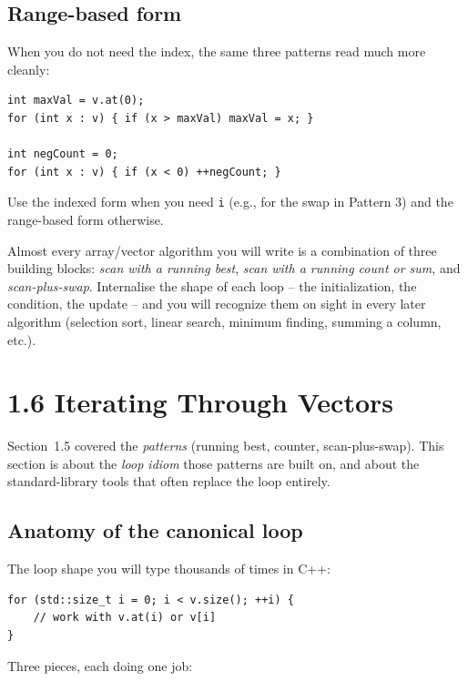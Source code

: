 \documentclass[11pt]{article}
\begin{document}
\subsection{Range-based form}

When you do not need the index, the same three patterns read much more
cleanly:
\begin{lstlisting}
int maxVal = v.at(0);
for (int x : v) { if (x > maxVal) maxVal = x; }

int negCount = 0;
for (int x : v) { if (x < 0) ++negCount; }
\end{lstlisting}

Use the indexed form when you need \texttt{i} (e.g., for the swap in
Pattern 3) and the range-based form otherwise.

\begin{ideabox}
Almost every array/vector algorithm you will write is a combination of
three building blocks: \emph{scan with a running best}, \emph{scan
with a running count or sum}, and \emph{scan-plus-swap}. Internalise
the shape of each loop -- the initialization, the condition, the
update -- and you will recognize them on sight in every later
algorithm (selection sort, linear search, minimum finding, summing a
column, etc.).
\end{ideabox}

\section{1.6 Iterating Through Vectors}

Section~1.5 covered the \emph{patterns} (running best, counter, scan-plus-swap).
This section is about the \emph{loop idiom} those patterns are built on,
and about the standard-library tools that often replace the loop entirely.

\subsection{Anatomy of the canonical loop}

The loop shape you will type thousands of times in C++:
\begin{lstlisting}
for (std::size_t i = 0; i < v.size(); ++i) {
    // work with v.at(i) or v[i]
}
\end{lstlisting}

Three pieces, each doing one job:
\end{document}
